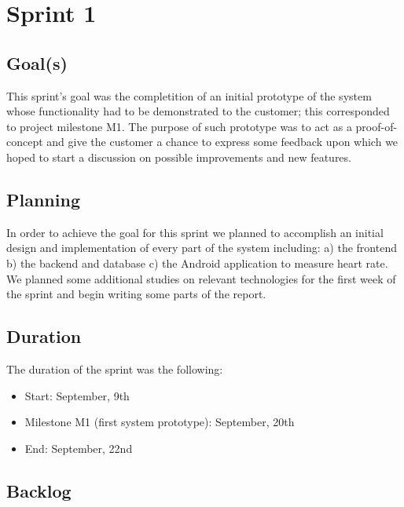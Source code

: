 

\chapter{Sprint 1}
\label{Sprint0}

\section{Goal(s)}
This sprint's goal was the completition of an initial prototype of the system whose functionality
had to be demonstrated to the customer; this corresponded to project milestone M1.
The purpose of such prototype was to act as a proof-of-concept and give the customer
a chance to express some feedback upon which we hoped to start a discussion
on possible improvements and new features.

\section{Planning}
In order to achieve the goal for this sprint we planned to accomplish an initial design
and implementation of every part of the system including:
a) the frontend b) the backend and database c) the Android application to measure heart rate.
We planned some additional studies on relevant technologies for the first week of the sprint
and begin writing some parts of the report.

\section{Duration}
The duration of the sprint was the following:
\begin{itemize}
\item Start: September, 9th
\item Milestone M1 (first system prototype): September, 20th
\item End: September, 22nd
\end{itemize}

\section{Backlog}

